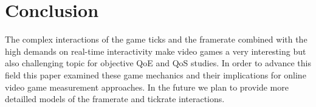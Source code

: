 \section{Conclusion}
\label{sec:conclusion}

The complex interactions of the game ticks and the framerate combined 
with the high demands on real-time interactivity make video games a 
very interesting but also challenging topic for objective \gls{QoE} and 
\gls{QoS} studies. In order to advance this field this paper examined 
these game mechanics and their implications for online video game 
measurement approaches. In the future we plan to provide more detailled 
models of the framerate and tickrate interactions.

